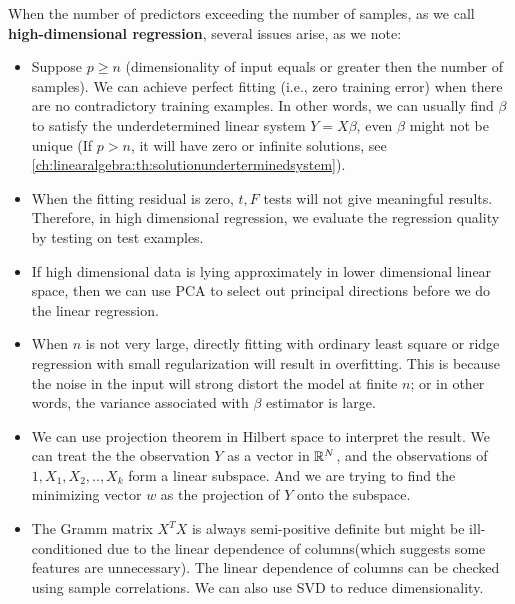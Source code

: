 \begin{refsection}
When the number of predictors exceeding the number of samples, as we call \textbf{high-dimensional regression}, several issues arise, as we note:
\begin{remark}\cite[241]{james2013introduction}
	\begin{itemize}
		\item 	Suppose $p \geq n$ (dimensionality of input equals or greater then the number of samples). We can achieve perfect fitting (i.e., zero training error) when there are no contradictory training examples. In other words, we can usually find $\beta$ to satisfy the underdetermined linear system $Y=X\beta$, even $\beta$ might not be unique (If $p>n$, it will have zero or infinite solutions, see \autoref{ch:linearalgebra:th:solutionunderterminedsystem}).
		\item When the fitting residual is zero,  $t,F$ tests will not give meaningful results. Therefore, in high dimensional regression, we evaluate the regression quality by testing on test examples.
	\end{itemize}
\end{remark}


\begin{remark}\hfill
	\begin{itemize}
		\item If high dimensional data is lying approximately in lower dimensional linear space, then we can use PCA to select out principal directions before we do the linear regression.
		\item When $n$ is not very large, directly fitting with ordinary least square or ridge regression with small regularization will result in overfitting. This is because the noise in the input will strong distort the model at finite $n$; or in other words, the variance associated with $\beta$ estimator is large.
	\end{itemize}
\end{remark}



\begin{remark}[interpretation]\hfill
	\begin{itemize}
		\item We can use projection theorem in Hilbert space to interpret the result. We can treat the the observation $Y$ as a vector in $\mathbb{R}^N$, and the observations of $1,X_1,X_2,..,X_k$ form a linear subspace. And we are trying to find the minimizing vector $w$ as the projection of $Y$ onto the subspace. 
		\item The Gramm matrix $X^TX$ is always semi-positive definite but might be ill-conditioned due to the linear dependence of columns(which suggests some features are unnecessary). The linear dependence of columns can be checked using sample correlations. We can also use SVD to reduce dimensionality.
	\end{itemize}
\end{remark}



\end{refsection}
